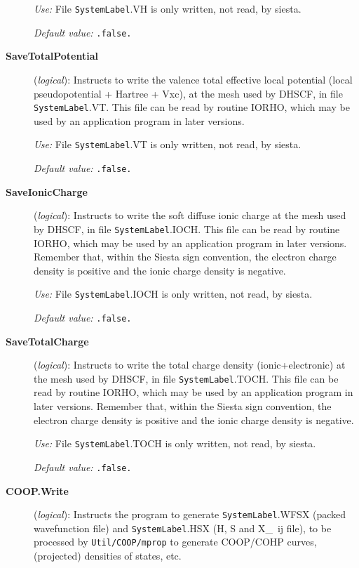 \documentclass[11pt]{article}
\begin{document}
\begin{description}
{\it Use:} File {\tt SystemLabel}.VH is only written, not read, by siesta.

{\it Default value:} {\tt .false.}
        

\item[{\bf SaveTotalPotential}] ({\it logical}): 
Instructs to write the valence total effective local potential
(local pseudopotential + Hartree + Vxc), at the
mesh used by DHSCF,
in file {\tt SystemLabel}.VT. This file can be read by routine IORHO,
which may be used by an application program in later versions.

{\it Use:} File {\tt SystemLabel}.VT is only written, not read, by siesta.

{\it Default value:} {\tt .false.}
        

\item[{\bf SaveIonicCharge}] ({\it logical}): 
Instructs to write the soft diffuse ionic charge at the
mesh used by DHSCF,
in file {\tt SystemLabel}.IOCH. This file can be read by routine IORHO,
which may be used by an application program in later versions.
Remember that, within the {\sc Siesta} sign convention, the electron charge
density is positive and the ionic charge density is negative. 


{\it Use:} File {\tt SystemLabel}.IOCH is only written, not read, by siesta.

{\it Default value:} {\tt .false.}
        
\item[{\bf SaveTotalCharge}] ({\it logical}): 
Instructs to write the total charge density (ionic+electronic) at the
mesh used by DHSCF,
in file {\tt SystemLabel}.TOCH. This file can be read by routine IORHO,
which may be used by an application program in later versions.
Remember that, within the {\sc Siesta} sign convention, the electron charge
density is positive and the ionic charge density is negative. 

{\it Use:} File {\tt SystemLabel}.TOCH is only written, not read, by siesta.

{\it Default value:} {\tt .false.}

\item[{\bf COOP.Write}] ({\it logical}): 
Instructs the program to generate  {\tt SystemLabel}.WFSX (packed
wavefunction file) and  {\tt SystemLabel}.HSX (H, S and X\_~{ij} file),
to be processed by {\tt Util/COOP/mprop} to generate COOP/COHP curves,
(projected) densities of states, etc.


\end{description}
\end{document}
